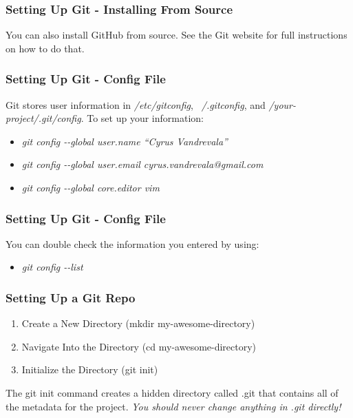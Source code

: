 \begin{frame}
\frametitle{\large{Setting Up Git - Installing From Source}}
You can also install GitHub from source. See the Git website for full instructions on how to do that.
\end{frame}

\begin{frame}
\frametitle{\large{Setting Up Git - Config File}}
Git stores user information in \emph{/etc/gitconfig}, \emph{~/.gitconfig}, and \emph{/your-project/.git/config}. To set up your information: \\
\begin{itemize}
\item \emph{git config -{}-global user.name ``Cyrus Vandrevala''}
\item \emph{git config -{}-global user.email cyrus.vandrevala@gmail.com}
\item \emph{git config -{}-global core.editor vim}
\end{itemize}
\end{frame}

\begin{frame}
\frametitle{\large{Setting Up Git - Config File}}
You can double check the information you entered by using: \\
\begin{itemize}
\item \emph{git config -{}-list}
\end{itemize}
\end{frame}

\begin{frame}
\frametitle{\large{Setting Up a Git Repo}}
\begin{enumerate}
\item Create a New Directory (mkdir my-awesome-directory)
\item Navigate Into the Directory (cd my-awesome-directory)
\item Initialize the Directory (git init)
\end{enumerate}
\vspace{5mm}
The git init command creates a hidden directory called .git that contains all of the metadata for the project. \emph{You should never change anything in .git directly!}
\end{frame}
\note{}